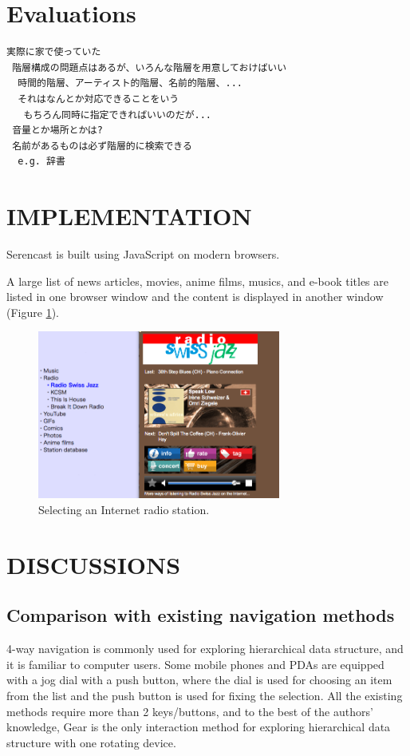 \documentclass{article}
\def\SC{\textsf{\small Serencast}}
\begin{document}
\section{Evaluations}

\begin{verbatim}
実際に家で使っていた
 階層構成の問題点はあるが、いろんな階層を用意しておけばいい
  時間的階層、アーティスト的階層、名前的階層、...
  それはなんとか対応できることをいう
   もちろん同時に指定できればいいのだが...
 音量とか場所とかは?
 名前があるものは必ず階層的に検索できる
  e.g. 辞書
\end{verbatim}

\section*{IMPLEMENTATION}

{\SC} is built using JavaScript on modern browsers.

A large list of news articles, movies, anime films, musics, and e-book titles are listed in one browser window
and the content is displayed in another window (Figure \ref{screenshot}).

\begin{figure}[H]
\centerline{\includegraphics[width=80mm,bb=0 0 671 464]{figures/95cf2fec71c52ead6fdbcb7f79aca654.png}}
\caption{Selecting an Internet radio station.}
\label{screenshot}
\end{figure}

\section*{DISCUSSIONS}

\subsection{Comparison with existing navigation methods}

4-way navigation is commonly used for exploring hierarchical data structure,
and it is familiar to computer users.
Some mobile phones and PDAs are equipped with a jog dial with a push button,
where the dial is used for choosing an item from the list and 
the push button is used for fixing the selection.
All the existing methods require more than 2 keys/buttons, and
to the best of the authors' knowledge,
Gear is the only interaction method for exploring hierarchical data structure
with one rotating device.
\end{document}
